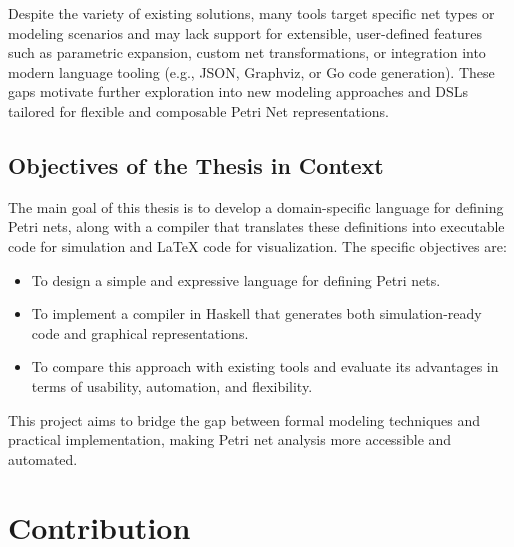\documentclass[12pt]{article}
\begin{document}
        Despite the variety of existing solutions, many tools target specific net types or modeling scenarios and may lack support for extensible, user-defined features such as parametric expansion, custom net transformations, or integration into modern language tooling (e.g., JSON, Graphviz, or Go code generation). These gaps motivate further exploration into new modeling approaches and DSLs tailored for flexible and composable Petri Net representations.


    \subsection{Objectives of the Thesis in Context}
    The main goal of this thesis is to develop a domain-specific language for defining Petri nets, along with a compiler that translates these definitions into executable code for simulation and LaTeX code for visualization. The specific objectives are:
    \begin{itemize}
        \item To design a simple and expressive language for defining Petri nets.
        \item To implement a compiler in Haskell that generates both simulation-ready code and graphical representations.
        \item To compare this approach with existing tools and evaluate its advantages in terms of usability, automation, and flexibility.
    \end{itemize}
    This project aims to bridge the gap between formal modeling techniques and practical implementation, making Petri net analysis more accessible and automated.
    
\section{Contribution}
\end{document}
